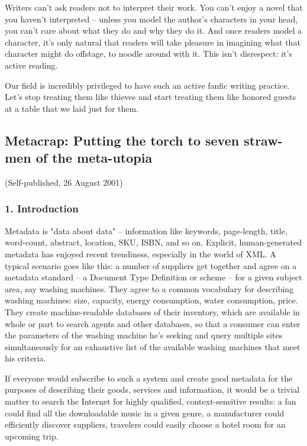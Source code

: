 Writers can't ask readers not to interpret their work. You can't
enjoy a novel that you haven't interpreted -- unless you model the
author's characters in your head, you can't care about what they do
and why they do it. And once readers model a character, it's only
natural that readers will take pleasure in imagining what that
character might do offstage, to noodle around with it. This isn't
disrespect: it's active reading.

Our field is incredibly privileged to have such an active fanfic
writing practice. Let's stop treating them like thieves and start
treating them like honored guests at a table that we laid just for
them.

\subsection{Metacrap: Putting the torch to seven straw-men of the meta-utopia}

(Self-published, 26 August 2001)

\subsubsection{1. Introduction}

Metadata is "data about data" -- information like keywords,
page-length, title, word-count, abstract, location, SKU, ISBN, and
so on. Explicit, human-generated metadata has enjoyed recent
trendiness, especially in the world of XML. A typical scenario goes
like this: a number of suppliers get together and agree on a
metadata standard -- a Document Type Definition or scheme -- for a
given subject area, say washing machines. They agree to a common
vocabulary for describing washing machines: size, capacity, energy
consumption, water consumption, price. They create machine-readable
databases of their inventory, which are available in whole or part
to search agents and other databases, so that a consumer can enter
the parameters of the washing machine he's seeking and query
multiple sites simultaneously for an exhaustive list of the
available washing machines that meet his criteria.

If everyone would subscribe to such a system and create good
metadata for the purposes of describing their goods, services and
information, it would be a trivial matter to search the Internet
for highly qualified, context-sensitive results: a fan could find
all the downloadable music in a given genre, a manufacturer could
efficiently discover suppliers, travelers could easily choose a
hotel room for an upcoming trip.

